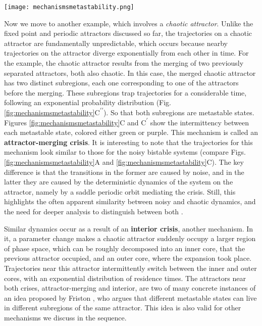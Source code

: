 \documentclass[reprint,superscriptaddress,showpacs,amsmath,amssymb,aps,floatfix,nolongbibliography]{revtex4-2}
\theoremstyle{definition}
\newcommand*{\supprime}{\textsuperscript{\everymodeprime}\xspace}
\newcommand*{\ssupprime}{\textsuperscript{\everymodeprime\everymodeprime\xspace}}
\newcommand*{\everymodeprime}{\ensuremath{\prime}}
\begin{document}
%
\begin{figure*}[hbt]
    \centering
    \texttt{[image: mechanismsmetastability.png]}
    \caption{\textbf{Dynamical mechanisms of metastability.} Each column corresponds to one mechanism, with the panels respectively showing a representative time-series, trajectories in phase space, and the distribution of residence times in each identified metastable state. Further details in the main text and Supplemental Material.}
    \label{fig:mechanismsmetastability}
\end{figure*}

Now we move to another example, which involves a \textit{chaotic attractor}. Unlike the fixed point and periodic attractors discussed so far, the trajectories on a chaotic attractor are fundamentally unpredictable, which occurs because nearby trajectories on the attractor diverge exponentially from each other in time. For the example, the chaotic attractor results from the merging of two previously separated attractors, both also chaotic. In this case, the merged chaotic attractor has two distinct subregions, each one corresponding to one of the attractors before the merging. These subregions trap trajectories for a considerable time, following an exponential probability distribution \cite{grebogi1983crises} (Fig. \ref{fig:mechanismsmetastability}C\ssupprime). So that both subregions are metastable states. Figures \ref{fig:mechanismsmetastability}C and C\supprime show the intermittency between each metastable state, colored either green or purple. This mechanism is called an \textbf{attractor-merging crisis}. 
It is interesting to note that the trajectories for this mechanism look similar to those for the noisy bistable systems (compare Figs. \ref{fig:mechanismsmetastability}A and \ref{fig:mechanismsmetastability}C). The key difference is that the transitions in the former are caused by noise, and in the latter they are caused by the deterministic dynamics of the system on the attractor, namely by a saddle periodic orbit mediating the crisis. Still, this highlights the often apparent similarity between noisy and chaotic dynamics, and the need for deeper analysis to distinguish between both \cite{boaretto2021discriminating}.

Similar dynamics occur as a result of an \textbf{interior crisis}, another mechanism. In it, a parameter change makes a chaotic attractor suddenly occupy a larger region of phase space, which can be roughly decomposed into an inner core, that the previous attractor occupied, and an outer core, where the expansion took place. Trajectories near this attractor intermittently switch between the inner and outer cores, with an exponential distribution of residence times. The attractors near both crises, attractor-merging and interior, are two of many concrete instances of an idea proposed by Friston \cite{friston2000transients}, who argues that different metastable states can live in different subregions of the same attractor. This idea is also valid for other mechanisms we discuss in the sequence.
\end{document}
